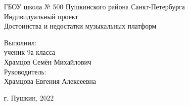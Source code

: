 \begin{center} 

\large ГБОУ школа № 500 Пушкинского района Санкт-Петербурга\\[5.5cm] 

\huge Индивидуальный проект \\[0.6cm]
\large Достоинства и недостатки музыкальных платформ\\[3.7cm]

\end{center} 

\begin{flushright}
  Выполнил: \\
  ученик 9а класса \\
  Храмцов Семён Михайлович \\
  Руководитель: \\
  Храмцова Евгения Алексеевна \\
\end{flushright}

\vfill 

\begin{center} 
\large г. Пушкин, 2022
\end{center} 

\thispagestyle{empty}